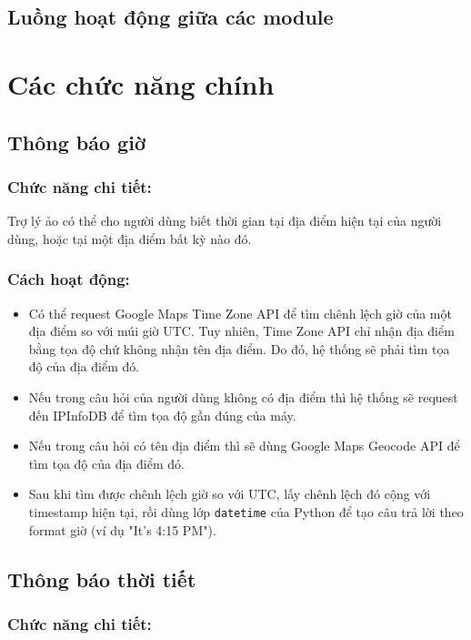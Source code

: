 \subsection{Luồng hoạt động giữa các module}

\section{Các chức năng chính}

\subsection{Thông báo giờ}

\subsubsection{Chức năng chi tiết:}

Trợ lý ảo có thể cho người dùng biết thời gian tại địa điểm hiện tại của người dùng, hoặc tại một địa điểm bất kỳ nào đó.

\subsubsection{Cách hoạt động:}

\begin{itemize}
    \item Có thể request Google Maps Time Zone API để tìm chênh lệch giờ của một địa điểm so với múi giờ UTC. Tuy nhiên, Time Zone API chỉ nhận địa điểm bằng tọa độ chứ không nhận tên địa điểm. Do đó, hệ thống sẽ phải tìm tọa độ của địa điểm đó.
    \item Nếu trong câu hỏi của người dùng không có địa điểm thì hệ thống sẽ request đến IPInfoDB để tìm tọa độ gần đúng của máy.
    \item Nếu trong câu hỏi có tên địa điểm thì sẽ dùng Google Maps Geocode API để tìm tọa độ của địa điểm đó.
    \item Sau khi tìm được chênh lệch giờ so với UTC, lấy chênh lệch đó cộng với timestamp hiện tại, rồi dùng lớp \lstinline{datetime} của Python để tạo câu trả lời theo format giờ (ví dụ "It's 4:15 PM").
\end{itemize}

\subsection{Thông báo thời tiết}

\subsubsection{Chức năng chi tiết:}

